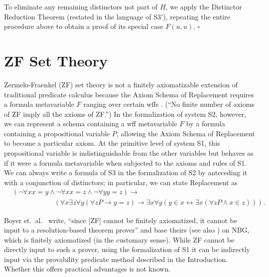 \documentclass[leqno]{article}
\begin{document}
     To eliminate any remaining distinctors not part of $H$, we apply
the Distinctor Reduction Theorem (restated in the language of S3\mbox{$'$}),
repeating the entire procedure above to obtain a proof of its special case
$F(u,u)$. \hfill $\square$


\section{ZF Set Theory}

     Zermelo-Fraenkel (ZF) set theory is not a finitely axiomatizable
extension of traditional predicate calculus because the Axiom Schema of
Replacement requires a formula metavariable $F$ ranging over certain wffs
\cite[p.\ 83]{Cohen}. (``No finite number of axioms of ZF imply all the axioms
of ZF.'')  In the formalization of system S2, however, we can represent a
schema containing a wff metavariable $F$ by a formula containing a
propositional variable $P$, allowing the Axiom Schema of Replacement to become
a particular axiom.  At the primitive level of system S1, this propositional
variable is indistinguishable from the other variables but behaves as if
it were a formula metavariable when subjected to the axioms and rules of S1.
We can always write a formula of S3 in the formalization of S2 by
anteceding it with a conjunction of distinctors; in particular, we
can state Replacement as
\begin{eqnarray*}
  & (\lnot \forall xx=y\wedge \lnot \forall xx=z\wedge \lnot \forall
yy=z)  \rightarrow \qquad\qquad\qquad\qquad\qquad\qquad \\
  & \qquad\qquad\qquad (\forall x\exists z\forall y(\forall
     zP\rightarrow y=z)\rightarrow
    \exists x\forall y(y\in x\leftrightarrow \exists x(\forall zP\wedge
    x\in z))).
\end{eqnarray*}

     Boyer et.\ al.\ \cite{Boyer} write, ``since [ZF] cannot be finitely
axiomatized, it cannot be input to a resolution-based theorem prover'' and
base theirs (see also \cite{Wos33}) on NBG, which is finitely axiomatized
(in the customary sense).  While ZF cannot be directly input to such a prover,
using the formalization of S1 it can be indirectly input via the provability
predicate method described in the Introduction.  Whether this offers practical
advantages is not known.
\end{document}
